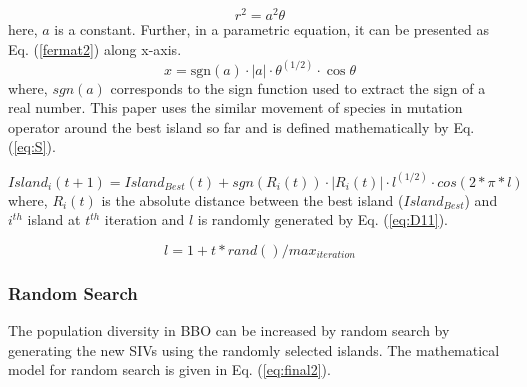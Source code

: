 \begin{equation}\label{fermat1}
r^{2}=a^{2}\theta
\end{equation}
here, $a$ is a constant. Further, in a parametric equation, it can be presented as Eq. (\ref{fermat2}) along x-axis. 
\begin{equation}\label{fermat2}
x={\text{sgn}}(a)\cdot |a|\cdot \theta ^{(1/2)}\cdot \cos \theta
\end{equation}
where, $sgn(a)$ corresponds to  the sign function used to extract the sign of a real number. This paper uses the similar movement of species in mutation operator around the best island so far and is defined mathematically by Eq. (\ref{eq:S}).



\begin{equation}\label{eq:S}
 Island_i(t+1)=Island_{Best}(t) + sgn(R_i(t))\cdot|R_i(t)|\cdot l ^{(1/2)}\cdot cos(2*\pi*l) 
\end{equation}
where, $R_i(t)$ is the absolute distance between the best island ($Island_{Best}$) and $i^{th}$ island at $t^{th}$ iteration and $l$ is randomly generated by Eq. (\ref{eq:D11}). 

\begin{equation}\label{eq:D11}
l=  1+ t*rand()/max_{iteration}
\end{equation}


\subsubsection{Random Search}

 The population diversity in BBO can be increased by random search by generating the new SIVs using the randomly selected islands. The mathematical model for random search is given in Eq. (\ref{eq:final2}).

